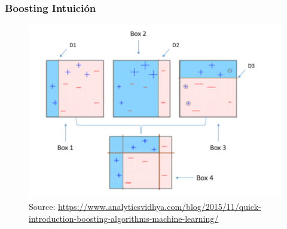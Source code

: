 \documentclass[
  shownotes,
  xcolor={svgnames},
  hyperref={colorlinks,citecolor=DarkBlue,linkcolor=DarkRed,urlcolor=DarkBlue}
  , aspectratio=169]{beamer}
\begin{document}
\begin{frame}[fragile]
\frametitle{Boosting Intuición}


\begin{figure}[H] \centering
            \captionsetup{justification=centering}
              \includegraphics[scale=0.5]{figures/adaboost.png}
              \\
              \tiny
              Source: \url{https://www.analyticsvidhya.com/blog/2015/11/quick-introduction-boosting-algorithms-machine-learning/}
 \end{figure}

\end{frame}

\end{document}
